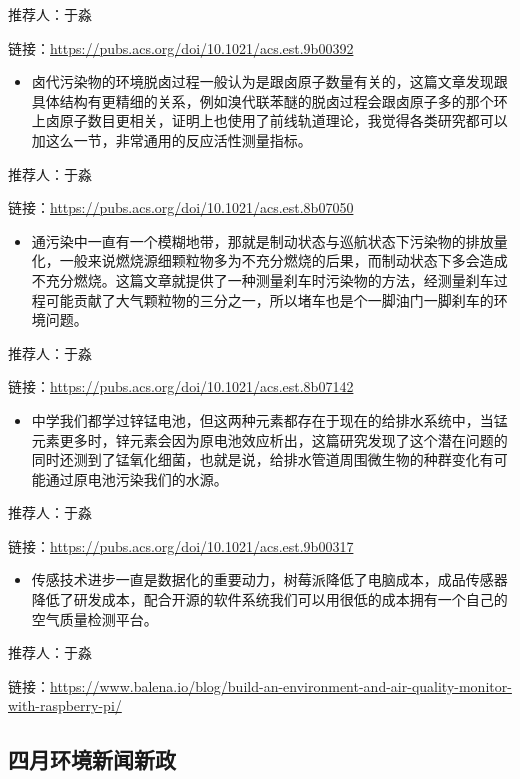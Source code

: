 \documentclass[]{book}
\providecommand{\tightlist}{%
  \setlength{\itemsep}{0pt}\setlength{\parskip}{0pt}}
\begin{document}
推荐人：于淼

链接：\url{https://pubs.acs.org/doi/10.1021/acs.est.9b00392}

\begin{itemize}
\tightlist
\item
  卤代污染物的环境脱卤过程一般认为是跟卤原子数量有关的，这篇文章发现跟具体结构有更精细的关系，例如溴代联苯醚的脱卤过程会跟卤原子多的那个环上卤原子数目更相关，证明上也使用了前线轨道理论，我觉得各类研究都可以加这么一节，非常通用的反应活性测量指标。
\end{itemize}

推荐人：于淼

链接：\url{https://pubs.acs.org/doi/10.1021/acs.est.8b07050}

\begin{itemize}
\tightlist
\item
  通污染中一直有一个模糊地带，那就是制动状态与巡航状态下污染物的排放量化，一般来说燃烧源细颗粒物多为不充分燃烧的后果，而制动状态下多会造成不充分燃烧。这篇文章就提供了一种测量刹车时污染物的方法，经测量刹车过程可能贡献了大气颗粒物的三分之一，所以堵车也是个一脚油门一脚刹车的环境问题。
\end{itemize}

推荐人：于淼

链接：\url{https://pubs.acs.org/doi/10.1021/acs.est.8b07142}

\begin{itemize}
\tightlist
\item
  中学我们都学过锌锰电池，但这两种元素都存在于现在的给排水系统中，当锰元素更多时，锌元素会因为原电池效应析出，这篇研究发现了这个潜在问题的同时还测到了锰氧化细菌，也就是说，给排水管道周围微生物的种群变化有可能通过原电池污染我们的水源。
\end{itemize}

推荐人：于淼

链接：\url{https://pubs.acs.org/doi/10.1021/acs.est.9b00317}

\begin{itemize}
\tightlist
\item
  传感技术进步一直是数据化的重要动力，树莓派降低了电脑成本，成品传感器降低了研发成本，配合开源的软件系统我们可以用很低的成本拥有一个自己的空气质量检测平台。
\end{itemize}

推荐人：于淼

链接：\url{https://www.balena.io/blog/build-an-environment-and-air-quality-monitor-with-raspberry-pi/}

\hypertarget{ux56dbux6708ux73afux5883ux65b0ux95fbux65b0ux653f}{%
\subsection*{四月环境新闻新政}\label{ux56dbux6708ux73afux5883ux65b0ux95fbux65b0ux653f}}
\end{document}
